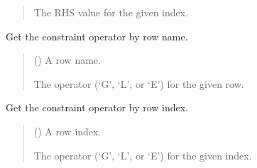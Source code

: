 \documentclass[letterpaper,12pt,english]{sphinxmanual}
\begin{document}
\begin{fulllineitems}
\begin{fulllineitems}
\begin{quote}
\begin{description}
\sphinxAtStartPar
{} \textendash{} The RHS value for the given index.

\end{description}\end{quote}

\end{fulllineitems}


\begin{fulllineitems}
\label{\detokenize{api/core:cbmpy.CBCommon.StructMatrixLP.getOperatorbyName}}
\pysigstartsignatures
\pysiglinewithargsret
{}
{}
{}
\pysigstopsignatures
\sphinxAtStartPar
Get the constraint operator by row name.
\begin{quote}\begin{description}
\sphinxAtStartPar
{} () \textendash{} A row name.

\sphinxAtStartPar
{} \textendash{} The operator (‘G’, ‘L’, or ‘E’) for the given row.

\end{description}\end{quote}

\end{fulllineitems}


\begin{fulllineitems}
\label{\detokenize{api/core:cbmpy.CBCommon.StructMatrixLP.getOperatorbyIdx}}
\pysigstartsignatures
\pysiglinewithargsret
{}
{}
{}
\pysigstopsignatures
\sphinxAtStartPar
Get the constraint operator by row index.
\begin{quote}\begin{description}
\sphinxAtStartPar
{} () \textendash{} A row index.

\sphinxAtStartPar
{} \textendash{} The operator (‘G’, ‘L’, or ‘E’) for the given index.

\end{description}\end{quote}

\end{fulllineitems}


\end{fulllineitems}
\end{document}
